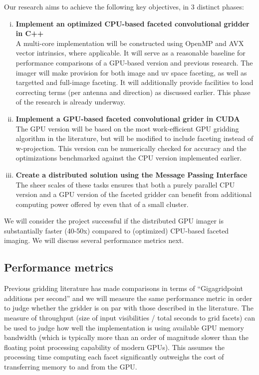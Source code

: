 \documentclass[a4paper, two column]{article}
\begin{document}
Our research aims to achieve the following key objectives, in 3 distinct phases:
\begin{enumerate}[i)]
 \item \textbf{Implement an optimized CPU-based faceted convolutional gridder in C++}\\
  A multi-core implementation will be constructed using OpenMP and AVX vector intrinsics, where applicable. It will serve as a reasonable baseline for performance 
  comparisons of a GPU-based version and previous research. The imager will make provision for both image and uv space faceting, as well as targetted and full-image faceting. It will 
  additionally provide facilities to load correcting terms (per antenna and direction) as discussed earlier. This phase of the research is already underway.
 \item \textbf{Implement a GPU-based faceted convolutional grider in CUDA}\\
  The GPU version will be based on the most work-efficient GPU gridding algorithm in the literature, but will be modified to include faceting instead of w-projection. This version
  can be numerically checked for accuracy and the optimizations benchmarked against the CPU version implemented earlier.
 \item \textbf{Create a distributed solution using the Message Passing Interface}\\
  The sheer scales of these tasks ensures that both a purely parallel CPU version and a GPU version of the faceted gridder can benefit from additional computing power offered by even that of a small cluster.
\end{enumerate}

We will consider the project successful if the distributed GPU imager is substantially faster (40-50x) compared to (optimized) CPU-based faceted imaging. We will discuss several performance metrics next.

\subsection{Performance metrics}
Previous gridding literature \cite{muscat2014high,romein2012efficient} has made comparisons in terms of ``Gigagridpoint additions per second'' and we will measure the same performance metric in order to judge 
whether the gridder is on par with those described in the literature. The measure of throughput (size of input visibilities / total seconds to grid facets) can be used to judge how well the implementation is 
using available GPU memory bandwidth (which is typically more than an order of magnitude slower than the floating point processing capability of modern GPUs). This assumes the processing time computing each 
facet significantly outweighs the cost of transferring memory to and from the GPU.
\end{document}
